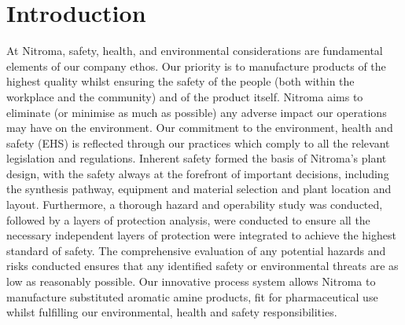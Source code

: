 \section{Introduction}

At Nitroma, safety, health, and environmental considerations are fundamental elements of our company ethos. Our priority is to manufacture products of the highest quality whilst ensuring the safety of the people (both within the workplace and the community) and of the product itself. Nitroma aims to eliminate (or minimise as much as possible) any adverse impact our operations may have on the environment. Our commitment to the environment, health and safety (EHS) is reflected through our practices which comply to all the relevant legislation and regulations. Inherent safety formed the basis of Nitroma’s plant design, with the safety always at the forefront of important decisions, including the synthesis pathway, equipment and material selection and plant location and layout. Furthermore, a thorough hazard and operability study was conducted, followed by a layers of protection analysis, were conducted to ensure all the necessary independent layers of protection were integrated to achieve the highest standard of safety. The comprehensive evaluation of any potential hazards and risks conducted ensures that any identified safety or environmental threats are as low as reasonably possible. Our innovative process system allows Nitroma to manufacture substituted aromatic amine products, fit for pharmaceutical use whilst fulfilling our environmental, health and safety responsibilities. 


